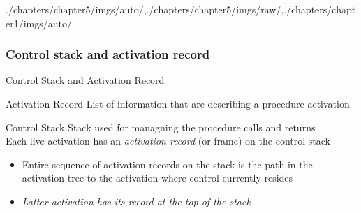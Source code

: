 \begin{graphicspathcontext}{{./chapters/chapter5/imgs/auto/},{./chapters/chapter5/imgs/raw/},{./chapters/chapter1/imgs/auto/}}
\begin{bibunit}[apalike]

\subsubsection{Control stack and activation record}
\subsubsectiontableofcontentslide

\begin{frame}{{Control Stack} and Activation Record}
	\begin{definitionblock}{Activation Record}
		List of information that are describing a procedure activation
	\end{definitionblock}
	\vspace{.25cm}
	\begin{definitionblock}{Control Stack}
		Stack used for managning the procedure calls and returns \\
		Each live activation has an \emph{activation record} (or frame) on the control stack \\
		
	\end{definitionblock}
	\vspace{.25cm}
	\begin{itemize}
		\item Entire sequence of activation records on the stack is the path in the activation tree to the activation where control currently resides
		\item \emph{Latter activation has its record at the top of the stack}
	\end{itemize}
\end{frame}



\end{bibunit}
\end{graphicspathcontext}

